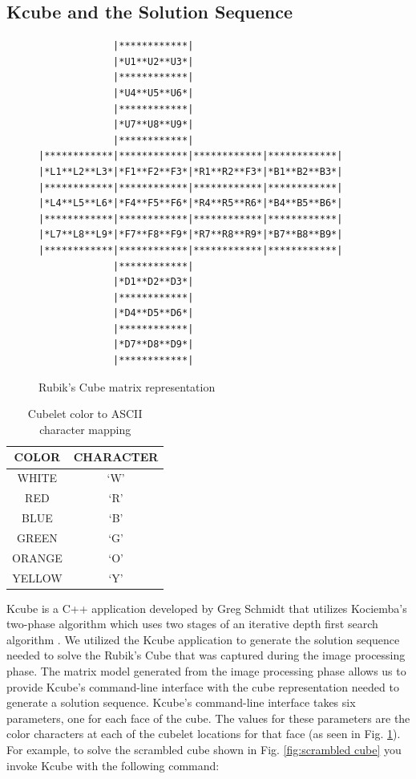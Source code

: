 \documentclass[final, letterpaper, 10 pt, conference, twocolumn]{IEEEtran}
\begin{document}
\subsection{Kcube and the Solution Sequence}
\begin{figure}[!ht]
\begin{center}
\begin{BVerbatim}
             |************|
             |*U1**U2**U3*|
             |************|
             |*U4**U5**U6*|
             |************|
             |*U7**U8**U9*|
             |************|
|************|************|************|************|
|*L1**L2**L3*|*F1**F2**F3*|*R1**R2**F3*|*B1**B2**B3*|
|************|************|************|************|
|*L4**L5**L6*|*F4**F5**F6*|*R4**R5**R6*|*B4**B5**B6*|
|************|************|************|************|
|*L7**L8**L9*|*F7**F8**F9*|*R7**R8**R9*|*B7**B8**B9*|
|************|************|************|************|
             |************|
             |*D1**D2**D3*|
             |************|
             |*D4**D5**D6*|
             |************|
             |*D7**D8**D9*|
             |************|
\end{BVerbatim}
\end{center}
\caption{Rubik's Cube matrix representation}
\label{fig:matrix layout}
\end{figure}

\begin{table}[!ht]
\caption{Cubelet color to ASCII character mapping}
\label{table:cubelet representation}
\centering
\begin{tabular}{|c|c|}
\hline
\textbf{COLOR} & \textbf{CHARACTER} \\ \hline
WHITE          & `W'              \\ \hline
RED            & `R'              \\ \hline
BLUE           & `B'              \\ \hline
GREEN          & `G'              \\ \hline
ORANGE         & `O'              \\ \hline
YELLOW         & `Y'              \\ \hline
\end{tabular}
\end{table}

\label{sec:Kcube}
Kcube is a C++ application developed by Greg Schmidt that utilizes Kociemba's two-phase algorithm which uses two stages of an iterative depth first search algorithm \cite{TheTwo-PhaseAlgorithm}. We utilized the Kcube application to generate the solution sequence needed to solve the Rubik's Cube that was captured during the image processing phase. The matrix model generated from the image processing phase allows us to provide Kcube's command-line interface with the cube representation needed to generate a solution sequence. Kcube's command-line interface takes six parameters, one for each face of the cube. The values for these parameters are the color characters at each of the cubelet locations for that face (as seen in Fig. \ref{fig:matrix layout}). For example, to solve the scrambled cube shown in Fig. \ref{fig:scrambled cube} you invoke Kcube with the following command:
\end{document}
